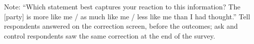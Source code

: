 \documentclass[11pt]{article}
\newcommand{\TableStyle}{\small\setlength{\tabcolsep}{5pt}\renewcommand{\arraystretch}{1.05}}
\begin{document}
\begin{table}[H]
\centering
\caption{Reactions to the correction (percent)}
\label{tab:reactions}
{\TableStyle{}}
\par\smallskip
\begin{minipage}{0.95\linewidth}\footnotesize
Note: ``Which statement best captures your reaction to this information? The [party] is more like me / as much like me / less like me than I had thought.'' Tell respondents answered on the correction screen, before the outcomes; ask and control respondents saw the same correction at the end of the survey.
\end{minipage}
\end{table}
\end{document}
